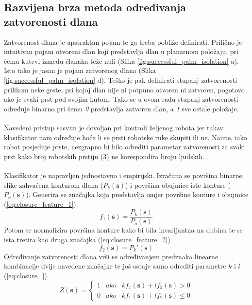 \documentclass[times, utf8, diplomski, numeric]{fer}
\begin{document}
\subsection{Razvijena brza metoda određivanja zatvorenosti dlana}
Zatvorenost dlana je apstraktan pojam te ga treba pobliže definirati. Prilično je intuitivan pojam otvoreni dlan koji predstavlja dlan u planarnom položaju, pri čemu kutevi između članaka teže nuli (Slika \ref{fig:successful_palm_isolation} a). Isto tako je jasan je pojam zatvorenog dlana (Slika \ref{fig:successful_palm_isolation} d). Teško je pak definirati stupanj zatvorenosti prilikom neke geste, pri kojoj dlan nije ni potpuno otvoren ni zatvoren, pogotovo ako je svaki prst pod svojim kutom. Tako se u ovom radu stupanj zatvorenosti određuje binarno pri čemu \textit{0} predstavlja zatvoren dlan, a \textit{1} sve ostale položaje.\\\\
Navedeni pristup sasvim je dovoljan pri kontroli željenog robota jer takav klasifikator nam određuje hoće li se prsti robotske ruke skupiti ili ne. Naime, iako robot posjeduje prste, nezgrapno bi bilo odrediti parametar zatvorenosti za svaki prst kako broj robotskih prstiju (3) ne korespondira broju ljudskih.\\\\
Klasifikator je napravljen jednostavno i empirijski. Izračuna se površina binarne slike zahvaćena konturom dlana ($ P_{k}(\mathbf{s}) $) i površina obujmice iste konture ($ P_{o}(\mathbf{s}) $). Generira se značajka koja predstavlja omjer površine konture i obujmice (\ref{eq:closure_feature_1}).
\begin{equation}\label{eq:closure_feature_1}
f_{1}(\mathbf{s})=\frac{P_{k}(\mathbf{s})}{ P_{o}(\mathbf{s})} 
\end{equation}
Potom se normalizira površina konture kako bi bila invarijantna na dubinu te se ista tretira kao druga značajka (\ref{eq:closure_feature_2}).
\begin{equation}\label{eq:closure_feature_2}
f_{2}(\mathbf{s})={P_{k}}'(\mathbf{s}) 
\end{equation}
Određivanje zatvorenosti dlana vrši se određivanjem predznaka linearne kombinacije dvije navedene značajke te još ostaje samo odrediti parametre $k$ i $l$ (\ref{eq:closure_}).
\begin{equation}\label{eq:closure_}
Z(\mathbf{s})=\left\{\begin{matrix}
 1&  ako&kf_{1}(\mathbf{s})+lf_{2}(\mathbf{s})>0\\
 0& ako & kf_{1}(\mathbf{s})+lf_{2}(\mathbf{s})\leq 0
\end{matrix}\right.
\end{equation}
\end{document}
